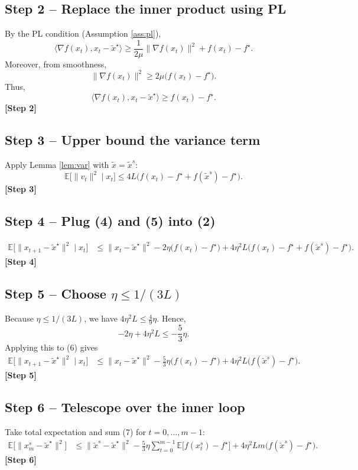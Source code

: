 \documentclass{article}
\begin{document}
\subsection*{Step 2 – Replace the inner product using PL}
By the PL condition (Assumption \ref{ass:pl}),
\[
\langle\nabla f(x_t),x_t-\tilde{x}^{\star}\rangle
\ge \frac{1}{2\mu}\|\nabla f(x_t)\|^{2} + f(x_t)-f^{\star}.
\]
Moreover, from smoothness,
\[
\|\nabla f(x_t)\|^{2}\ge 2\mu\bigl(f(x_t)-f^{\star}\bigr). \tag{3}
\]
Thus,
\[
\langle\nabla f(x_t),x_t-\tilde{x}^{\star}\rangle
\ge f(x_t)-f^{\star}. \tag{4}
\]
\textbf{[Step 2]}

\subsection*{Step 3 – Upper bound the variance term}
Apply Lemma \ref{lem:var} with $\tilde{x}=\tilde{x}^{s}$:
\[
\mathbb{E}\!\bigl[\|v_t\|^{2}\mid x_t\bigr]
\le 4L\bigl(f(x_t)-f^{\star}+f(\tilde{x}^{s})-f^{\star}\bigr). \tag{5}
\]
\textbf{[Step 3]}

\subsection*{Step 4 – Plug (4) and (5) into (2)}
\begin{align}
\mathbb{E}\!\bigl[\|x_{t+1}-\tilde{x}^{\star}\|^{2}\mid x_t\bigr]
&\le \|x_t-\tilde{x}^{\star}\|^{2}
   -2\eta\bigl(f(x_t)-f^{\star}\bigr)
   +4\eta^{2}L\bigl(f(x_t)-f^{\star}+f(\tilde{x}^{s})-f^{\star}\bigr). \tag{6}
\end{align}
\textbf{[Step 4]}

\subsection*{Step 5 – Choose $\eta\le 1/(3L)$}
Because $\eta\le 1/(3L)$, we have $4\eta^{2}L\le \frac{4}{9}\eta$. Hence,
\[
-2\eta +4\eta^{2}L \le -\frac{5}{3}\eta .
\]
Applying this to (6) gives
\begin{align}
\mathbb{E}\!\bigl[\|x_{t+1}-\tilde{x}^{\star}\|^{2}\mid x_t\bigr]
&\le \|x_t-\tilde{x}^{\star}\|^{2}
   -\frac{5}{3}\eta\bigl(f(x_t)-f^{\star}\bigr)
   +4\eta^{2}L\bigl(f(\tilde{x}^{s})-f^{\star}\bigr). \tag{7}
\end{align}
\textbf{[Step 5]}

\subsection*{Step 6 – Telescope over the inner loop}
Take total expectation and sum (7) for $t=0,\dots,m-1$:
\begin{align}
\mathbb{E}\!\bigl[\|x_{m}^{s}-\tilde{x}^{\star}\|^{2}\bigr]
&\le \| \tilde{x}^{s}-\tilde{x}^{\star}\|^{2}
   -\frac{5}{3}\eta\sum_{t=0}^{m-1}\mathbb{E}\!\bigl[f(x_t^{s})-f^{\star}\bigr]
   +4\eta^{2}L m\bigl(f(\tilde{x}^{s})-f^{\star}\bigr). \tag{8}
\end{align}
\textbf{[Step 6]}
\end{document}
